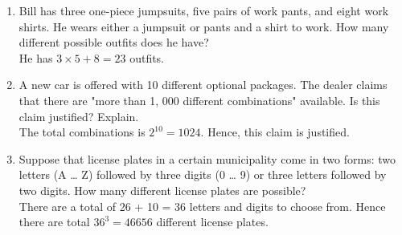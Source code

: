 \documentclass[10pt]{article}
\begin{document}
\begin{enumerate}
  \item Bill has three one-piece jumpsuits, five pairs of work pants, and eight work shirts. He wears either a jumpsuit or pants and a shirt to work. How many different possible outfits does he have?\\
  He has $3 \times 5 + 8 = 23$ outfits.

  \item A new car is offered with 10 different optional packages. The dealer claims that there are "more than 1, 000 different combinations" available. Is this claim justified? Explain.\\
  The total combinations is $2^{10} = 1024.$ Hence, this claim is justified.

  \item Suppose that license plates in a certain municipality come in two forms: two letters (A … Z) followed by three digits (0 … 9) or three letters followed by two digits. How many different license plates are possible?\\
        There are a total of 26 + 10 = 36 letters and digits to choose from. Hence there are total $36^3 = 46656$ different license plates.


\end{enumerate}
\end{document}
